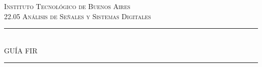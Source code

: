 \begin{titlepage}
\newcommand{\HRule}
{\rule{\linewidth}{0.5mm}}
\center
\textsc{\LARGE Instituto Tecnológico de Buenos Aires}\\[2cm]
\textsc{\Large 22.05 Análisis de Señales y Sistemas Digitales}\\[1.5cm]
%
\HRule \\[0.5cm]
\textsc{ \huge GUÍA FIR}\\[0.5cm]
\HRule \\[2cm]
     

\end{titlepage}
